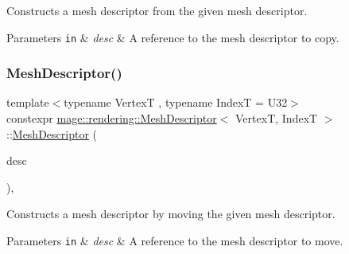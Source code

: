 Constructs a mesh descriptor from the given mesh descriptor.


\begin{DoxyParams}[1]{Parameters}
\mbox{\tt in}  & {\em desc} & A reference to the mesh descriptor to copy. \\
\hline
\end{DoxyParams}
\mbox{\label{classmage_1_1rendering_1_1_mesh_descriptor_a929e3b4b29e421f921e5d17d0a382275}} 
\subsubsection{\texorpdfstring{Mesh\+Descriptor()}{MeshDescriptor()}\hspace{0.1cm}{\footnotesize\ttfamily [3/3]}}
{\footnotesize\ttfamily template$<$typename VertexT , typename IndexT  = U32$>$ \\
constexpr \mbox{\hyperlink{classmage_1_1rendering_1_1_mesh_descriptor}{mage\+::rendering\+::\+Mesh\+Descriptor}}$<$ VertexT, IndexT $>$\+::\mbox{\hyperlink{classmage_1_1rendering_1_1_mesh_descriptor}{Mesh\+Descriptor}} (\begin{DoxyParamCaption}\item[{\mbox{\hyperlink{classmage_1_1rendering_1_1_mesh_descriptor}{Mesh\+Descriptor}}$<$ VertexT, IndexT $>$ \&\&}]{desc }\end{DoxyParamCaption})\hspace{0.3cm}{\ttfamily [default]}, {\ttfamily [noexcept]}}

Constructs a mesh descriptor by moving the given mesh descriptor.


\begin{DoxyParams}[1]{Parameters}
\mbox{\tt in}  & {\em desc} & A reference to the mesh descriptor to move. \\
\hline
\end{DoxyParams}
\mbox{\label{classmage_1_1rendering_1_1_mesh_descriptor_a0948d279801d1b4eb7eb5dca8b0f86ea}} 
